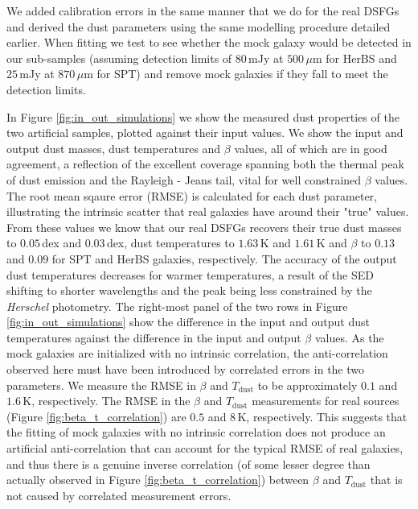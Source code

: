 We added calibration errors in the same manner that we do for the real DSFGs and derived the dust parameters using the same modelling procedure detailed earlier. When fitting we test to see whether the mock galaxy would be detected in our sub-samples (assuming detection limits of $80\,$mJy at $500\,\mu$m for HerBS and $25\,$mJy at $870\,\mu$m for SPT) and remove mock galaxies if they fall to meet the detection limits.

In Figure \ref{fig:in_out_simulations} we show the measured dust properties of the two artificial samples, plotted against their input values. We show the input and output dust masses, dust temperatures and $\beta$ values, all of which are in good agreement, a reflection of the excellent coverage spanning both the thermal peak of dust emission and the Rayleigh - Jeans tail, vital for well constrained $\beta$ values. The root mean sqaure error (RMSE) is calculated for each dust parameter, illustrating the intrinsic scatter that real galaxies have around their "true" values. From these values we know that our real DSFGs recovers their true dust masses to $0.05\,$dex and $0.03\,$dex, dust temperatures to $1.63\,$K and $1.61\,$K and $\beta$ to $0.13$ and $0.09$ for SPT and HerBS galaxies, respectively. The accuracy of the output dust temperatures decreases for warmer temperatures, a result of the SED shifting to shorter wavelengths and the peak being less constrained by the \textit{Herschel} photometry. The right-most panel of the two rows in Figure \ref{fig:in_out_simulations} show the difference in the input and output dust temperatures against the difference in the input and output $\beta$ values. As the mock galaxies are initialized with no intrinsic correlation, the anti-correlation observed here must have been introduced by correlated errors in the two parameters. We measure the RMSE in $\beta$ and $T_\textrm{dust}$ to be approximately $0.1$ and $1.6\,$K, respectively. The RMSE in the $\beta$ and $T_\textrm{dust}$ measurements for real sources (Figure \ref{fig:beta_t_correlation}) are $0.5$ and $8\,$K, respectively. This suggests that the fitting of mock galaxies with no intrinsic correlation does not produce an artificial anti-correlation that can account for the typical RMSE of real galaxies, and thus there is a genuine inverse correlation (of some lesser degree than actually observed in Figure \ref{fig:beta_t_correlation}) between $\beta$ and $T_\textrm{dust}$ that is not caused by correlated measurement errors.

